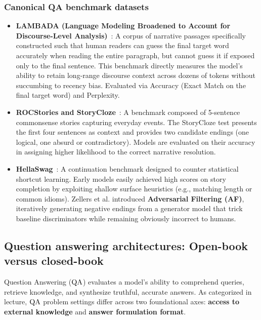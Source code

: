 \documentclass[../../main.tex]{subfiles}
\begin{document}
\subsubsection{Canonical QA benchmark datasets}
\begin{itemize}
    \item \textbf{LAMBADA (Language Modeling Broadened to Account for Discourse-Level Analysis)}~\cite{paperno2016lambada}: A corpus of narrative passages specifically constructed such that human readers can guess the final target word accurately when reading the entire paragraph, but cannot guess it if exposed only to the final sentence. This benchmark directly measures the model's ability to retain long-range discourse context across dozens of tokens without succumbing to recency bias. Evaluated via Accuracy (Exact Match on the final target word) and Perplexity.
    \item \textbf{ROCStories and StoryCloze}~\cite{mostafazadeh2016rocstories}: A benchmark composed of 5-sentence commonsense stories capturing everyday events. The StoryCloze test presents the first four sentences as context and provides two candidate endings (one logical, one absurd or contradictory). Models are evaluated on their accuracy in assigning higher likelihood to the correct narrative resolution.
    \item \textbf{HellaSwag}~\cite{zellers2019hellaswag}: A continuation benchmark designed to counter statistical shortcut learning. Early models easily achieved high scores on story completion by exploiting shallow surface heuristics (e.g., matching length or common idioms). Zellers et al. introduced \textbf{Adversarial Filtering (AF)}, iteratively generating negative endings from a generator model that trick baseline discriminators while remaining obviously incorrect to humans.
\end{itemize}

\subsection{Question answering architectures: Open-book versus closed-book}
\label{subsec:question_answering}

Question Answering ($\mathrm{QA}$) evaluates a model's ability to comprehend queries, retrieve knowledge, and synthesize truthful, accurate answers. As categorized in lecture, $\mathrm{QA}$ problem settings differ across two foundational axes: \textbf{access to external knowledge} and \textbf{answer formulation format}.
\end{document}
